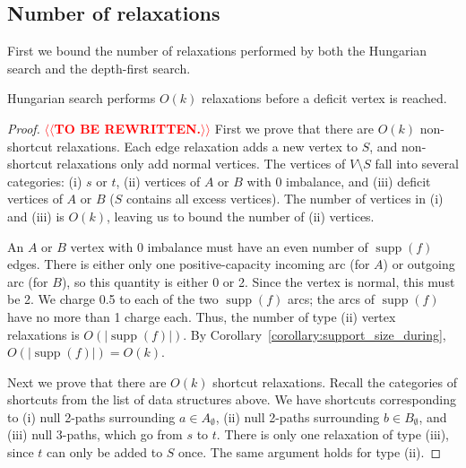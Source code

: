 \documentclass[a4paper,UKenglish]{socg-lipics-v2018}
\makeatletter
\def\supp{\operatorname{supp}}
\theoremstyle{plain}
\numberwithin{figure}{section}
\def\n@te#1{\textsf{\boldmath \textbf{$\langle\!\langle$#1$\rangle\!\rangle$}}\leavevmode}
\def\note#1{\textcolor{red}{\n@te{#1}}}
\makeatother
\begin{document}
\begin{toappendix}
\subsection{Number of relaxations}
\label{SSA:num-relaxation}

First we bound the number of relaxations performed by both the Hungarian search and the depth-first search.

\begin{lemmarep}
\label{lemma:goldberg_hs_length}
Hungarian search performs $O(k)$ relaxations before a deficit vertex is reached.
\end{lemmarep}

\begin{proof}
\note{TO BE REWRITTEN.}
First we prove that there are $O(k)$ non-shortcut relaxations.
%
Each edge relaxation adds a new vertex to $S$, and non-shortcut relaxations
only add normal vertices.
The vertices of $V \setminus S$ fall into several categories:
(i) $s$ or $t$, (ii) vertices of $A$ or $B$ with 0 imbalance, and (iii)
deficit vertices of $A$ or $B$ ($S$ contains all excess vertices).
The number of vertices in (i) and (iii) is $O(k)$, leaving us to bound the
number of (ii) vertices.

An $A$ or $B$ vertex with $0$ imbalance must have an even number of $\supp(f)$
edges.
There is either only one positive-capacity incoming arc (for $A$) or outgoing
arc (for $B$), so this quantity is either 0 or 2.
Since the vertex is normal, this must be 2.
We charge 0.5 to each of the two $\supp(f)$ arcs; the arcs of $\supp(f)$
have no more than 1 charge each.
Thus, the number of type (ii) vertex relaxations is $O(|\supp(f)|)$.
By Corollary~\ref{corollary:support_size_during}, $O(|\supp(f)|) = O(k)$.

Next we prove that there are $O(k)$ shortcut relaxations.
%
Recall the categories of shortcuts from the list of data structures above.
We have shortcuts corresponding to (i) null 2-paths surrounding
$a \in A_\emptyset$, (ii) null 2-paths surrounding $b \in B_\emptyset$, and
(iii) null 3-paths, which go from $s$ to $t$.
%
There is only one relaxation of type (iii), since $t$ can only be added to $S$
once.
The same argument holds for type (ii).


\end{proof}
\end{toappendix}
\end{document}
